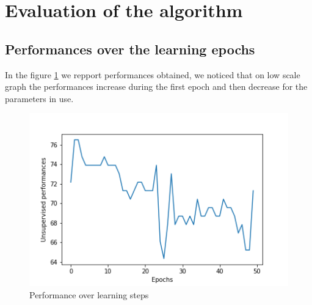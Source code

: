 \documentclass{article}
\begin{document}
    \section{Evaluation of the algorithm}

    \subsection{Performances over the learning epochs}
            
    In the figure \ref{perf_ev_football} we repport performances obtained, we noticed that on low scale graph the performances 
    increase during the first epoch and then decrease for the parameters in use.

    \begin{figure}[h]
        \centering
        \includegraphics[scale=0.8]{media/football_performances.png}

        \caption{Performance over learning steps}
        \label{perf_ev_football}
    \end{figure}
\end{document}

